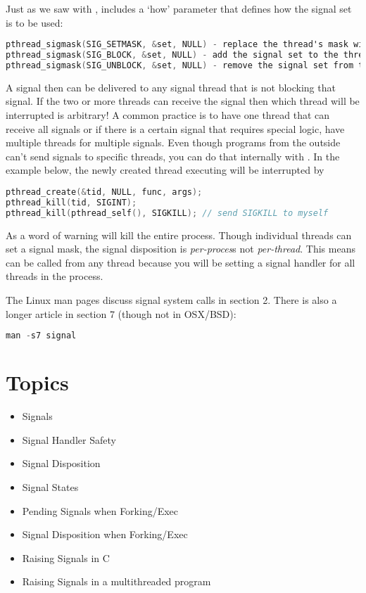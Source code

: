 Just as we saw with ,  includes a `how' parameter that defines how the signal set is to be used:

\begin{lstlisting}[language=C]
pthread_sigmask(SIG_SETMASK, &set, NULL) - replace the thread's mask with given signal set
pthread_sigmask(SIG_BLOCK, &set, NULL) - add the signal set to the thread's mask
pthread_sigmask(SIG_UNBLOCK, &set, NULL) - remove the signal set from the thread's mask
\end{lstlisting}

A signal then can be delivered to any signal thread that is not blocking that signal.
If the two or more threads can receive the signal then which thread will be interrupted is arbitrary!
A common practice is to have one thread that can receive all signals or if there is a certain signal that requires special logic, have multiple threads for multiple signals.
Even though programs from the outside can't send signals to specific threads, you can do that internally with .
In the example below, the newly created thread executing  will be interrupted by 

\begin{lstlisting}[language=C]
pthread_create(&tid, NULL, func, args);
pthread_kill(tid, SIGINT);
pthread_kill(pthread_self(), SIGKILL); // send SIGKILL to myself
\end{lstlisting}

As a word of warning  will kill the entire process.
Though individual threads can set a signal mask, the signal disposition is \emph{per-proces}s not \emph{per-thread}.
This means  can be called from any thread because you will be setting a signal handler for all threads in the process.

The Linux man pages discuss signal system calls in section 2. There is also a longer article in section 7 (though not in OSX/BSD):

\begin{lstlisting}[language=C]
man -s7 signal
\end{lstlisting}

\section{Topics}

\begin{itemize}
\tightlist
\item
  Signals
\item
  Signal Handler Safety
\item
  Signal Disposition
\item
  Signal States
\item
  Pending Signals when Forking/Exec
\item
  Signal Disposition when Forking/Exec
\item
  Raising Signals in C
\item
  Raising Signals in a multithreaded program
\end{itemize}

